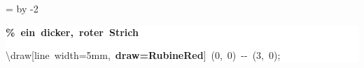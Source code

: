 \begingroup
\ttfamily
{}
=\textwidth
\advance{} by -2\fboxsep
\noindent
\colorbox{background}
{%
\parbox{\dimen255}
{%
\rule[-0.5ex]{0pt}{2.5ex}\hspace*{0.0em}\textcolor{G}{\textbf{\%~ein~dicker,~roter~Strich}}\\
\rule[-0.5ex]{0pt}{2.5ex}\hspace*{0.0em}\textbackslash{}draw[line~width=5mm,~\textcolor{R}{\textbf{draw=RubineRed}}]~(0,~0)~{-}{-}~(3,~0);}%
}%
\endgroup
